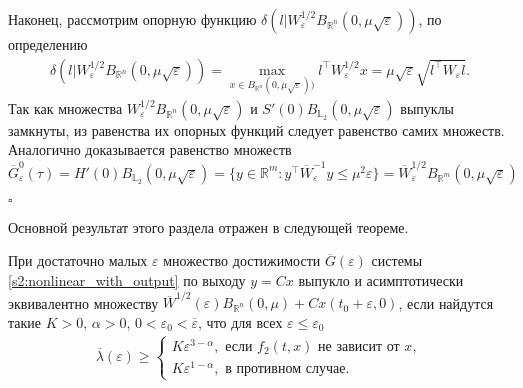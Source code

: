 \documentclass[../main.tex]{subfiles}
\begin{document}
Наконец, рассмотрим опорную функцию $\delta(l | W^{1/2}_{\varepsilon} B_{\mathbb{R}^n}(0,\mu\sqrt{\varepsilon}))$, по определению
\begin{gather*}
	\delta(l | W^{1/2}_{\varepsilon} B_{\mathbb{R}^n}(0,\mu\sqrt{\varepsilon})) = \max\limits_{x \in B_{\mathbb{R}^n}(0,\mu\sqrt{\varepsilon}))} l^{\top} W^{1/2}_{\varepsilon} x = \mu\sqrt{\varepsilon} \sqrt{l^{\top} W_{\varepsilon} l}.
\end{gather*}
Так как множества $W^{1/2}_{\varepsilon} B_{\mathbb{R}^n}(0,\mu\sqrt{\varepsilon}) $ и $S'(0) B_{\mathbb{L}_2}(0,\mu\sqrt{\varepsilon})$ выпуклы замкнуты, из равенства их опорных функций следует равенство самих множеств. 
Аналогично доказывается равенство множеств $\overline{G}^0_{\varepsilon}(\tau) = H'(0) B_{\mathbb{L}_2}(0,\mu\sqrt{\varepsilon}) =  \{ y \in \mathbb{R}^m: y^{\top} \overline{W}^{-1}_{\varepsilon} y \leqslant \mu^2 \varepsilon \} = \overline{W}^{1/2}_{\varepsilon} B_{\mathbb{R}^m}(0,\mu\sqrt{\varepsilon})$

 \hfill $\square$
    
Основной результат этого раздела отражен в следующей теореме.
\begin{theorem}\label{s2:th:assimptotic_equality}
        При достаточно малых $ \varepsilon $ множество достижимости $ \overline{G}(\varepsilon) $ системы \eqref{s2:nonlinear_with_output} по выходу $ y = C x $ выпукло и асимптотически эквивалентно множеству $\overline{W}^{1/2}(\varepsilon)B_{\mathbb{R}^n}(0,\mu) + Cx(t_0+\varepsilon,0)$, если найдутся такие $ K>0 $, $ \alpha > 0 $, $ 0< \varepsilon_0<\overline{\varepsilon}  $, что для всех $ \varepsilon \leqslant \varepsilon_0 $
        \begin{gather}\label{s2:cond1}
           \overline{\lambda}(\varepsilon) \geqslant \left\{ {\begin{array}{*{20}{l}}
                    {K\varepsilon ^{3 - \alpha}, \mbox{\ если \ } f_2(t,x) \mbox{\ не зависит от \ } x}, \\
                    {K\varepsilon ^{1 - \alpha}}, \mbox{\ в противном случае}.
            \end{array}} \right.
        \end{gather}
\end{theorem}
    
\end{document}
